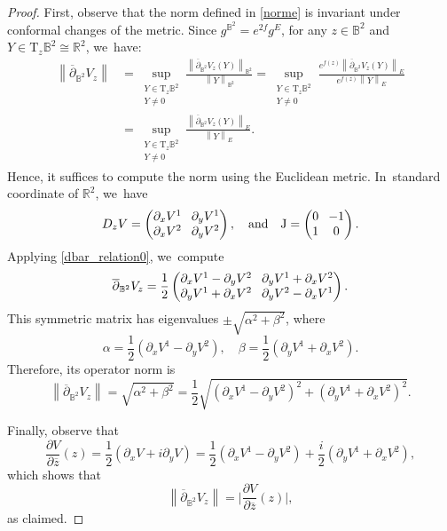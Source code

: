 \documentclass[11pt]{article}
\theoremstyle{plain}
\theoremstyle{definition}
\begin{document}
\begin{proof}
First, observe that the norm defined in \eqref{norme} is invariant under conformal changes of the metric. Since \(g^{\mathbb{B}^2} = e^{2f} g^E \), for any \(z \in \mathbb{B}^2 \) and \(Y \in \mathrm{T}_z \mathbb{B}^2 \cong \mathbb{R}^2 \), we~have:
\begin{align*}
\left\lVert \overline{\partial}_{\mathbb{B}^2}V_z \right\rVert
&= \sup_{\substack{Y \in \mathrm{T}_z \mathbb{B}^2 \\ Y \neq 0}} \frac{\left\lVert \overline{\partial}_{\mathbb{B}^2}V_z(Y) \right\rVert_{\mathbb{B}^2}}{\left\lVert Y \right\rVert_{\mathbb{B}^2}} = \sup_{\substack{Y \in \mathrm{T}_z \mathbb{B}^2 \\ Y \neq 0}} \frac{e^{f(z)} \left\lVert \overline{\partial}_{\mathbb{B}^2}V_z(Y) \right\rVert_E}{e^{f(z)} \left\lVert Y \right\rVert_E} \\
&= \sup_{\substack{Y \in \mathrm{T}_z \mathbb{B}^2 \\ Y \neq 0}} \frac{ \left\lVert\overline{\partial}_{\mathbb{B}^2}V_z(Y) \right\rVert_E}{\left \lVert Y \right\rVert_E}.
\end{align*}
Hence, it suffices to compute the norm using the Euclidean metric. In~standard coordinate of $\mathbb{R}^2$, we~have
\[\arraycolsep4pt
D_z V =
\begin{pmatrix}
\partial_x V^1 & \partial_y V^1 \\
\partial_x V^2 & \partial_y V^2
\end{pmatrix},
\quad
\text{and} \quad
\mathrm{J} =
\begin{pmatrix}
0 & -1 \\
1 & 0
\end{pmatrix}.
\]
Applying \eqref{dbar_relation0}, we~compute
\[\arraycolsep4pt
\overline{\partial}_{\mathbb{B}^2}V_z
=
\frac{1}{2}
\begin{pmatrix}
\partial_x V^1 - \partial_y V^2 & \partial_y V^1 + \partial_x V^2 \\
\partial_y V^1 + \partial_x V^2 & \partial_y V^2 - \partial_x V^1
\end{pmatrix}.
\]
This symmetric matrix has eigenvalues \(\pm \sqrt{\alpha^2 + \beta^2} \), where
\[
\alpha = \frac{1}{2}(\partial_x V^1 - \partial_y V^2), \quad
\beta = \frac{1}{2}(\partial_y V^1 + \partial_x V^2).
\]
Therefore, its operator norm is
\[
\left\lVert \overline{\partial}_{\mathbb{B}^2}V_z \right\rVert
= \sqrt{\alpha^2 + \beta^2}
= \frac{1}{2} \sqrt{(\partial_x V^1 - \partial_y V^2)^2 + (\partial_y V^1 + \partial_x V^2)^2}.
\]

Finally, observe that
\[
\frac{\partial V}{\partial \overline{z}}(z)
= \frac{1}{2} \left(\partial_x V + i \partial_y V \right)
= \frac{1}{2} \left(\partial_x V^1 - \partial_y V^2 \right) + \frac{i}{2}(\partial_y V^1 + \partial_x V^2),
\]
which shows that
\[
\left\lVert \overline{\partial}_{\mathbb{B}^2} V_z \right\rVert = \biggl| \frac{\partial V}{\partial \overline{z}}(z) \biggr|,
\]
as claimed.
\end{proof}
\end{document}
